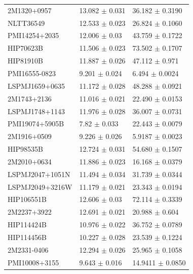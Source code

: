 \documentclass[11pt]{article}
\begin{document}
\begin{table}[htbp]
{\begin{tabular}{|l | l | l |}
2M1320+0957 & 13.082 $\pm$ 0.031 & 36.182 $\pm$ 0.3190\\
NLTT36549 & 12.533 $\pm$ 0.023 & 26.824 $\pm$ 0.1060\\
PMI14254+2035 & 12.006 $\pm$ 0.03 & 43.759 $\pm$ 0.1722\\
HIP70623B & 11.506 $\pm$ 0.023 & 73.502 $\pm$ 0.1707\\
HIP81910B & 11.887 $\pm$ 0.026 & 47.112 $\pm$ 0.971\\
PMI16555-0823 & 9.201 $\pm$ 0.024 & 6.494 $\pm$ 0.0024\\
LSPMJ1659+0635 & 11.172 $\pm$ 0.028 & 48.288 $\pm$ 0.0921\\
2M1743+2136 & 11.016 $\pm$ 0.021 & 22.490 $\pm$ 0.0153\\
LSPMJ1748+1143 & 11.976 $\pm$ 0.028 & 36.007 $\pm$ 0.0731\\
PMI19074+5905B & 7.82 $\pm$ 0.033 & 22.443 $\pm$ 0.0079\\
2M1916+0509 & 9.226 $\pm$ 0.026 & 5.9187 $\pm$ 0.0023\\
HIP98535B & 12.724 $\pm$ 0.031 & 54.680 $\pm$ 0.1507\\
2M2010+0634 & 11.886 $\pm$ 0.023 & 16.168 $\pm$ 0.0379\\
LSPMJ2047+1051N & 11.494 $\pm$ 0.034 & 31.739 $\pm$ 0.0344\\
LSPMJ2049+3216W & 11.179 $\pm$ 0.021 & 23.343 $\pm$ 0.0194\\
HIP106551B & 12.606 $\pm$ 0.03 & 72.114 $\pm$ 0.3339\\
2M2237+3922 & 12.691 $\pm$ 0.021 & 20.988 $\pm$ 0.604\\
HIP114424B & 10.976 $\pm$ 0.022 & 36.752 $\pm$ 0.0789\\
HIP114456B & 10.227 $\pm$ 0.028 & 23.539 $\pm$ 0.1224\\
2M2331-0406 & 12.294 $\pm$ 0.026 & 25.965 $\pm$ 0.1058\\
PMI10008+3155 & 9.643 $\pm$ 0.016 & 14.9411 $\pm$ 0.0850\\
\hline
\end{tabular}
}
\end{table}
\end{document}
